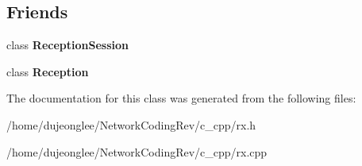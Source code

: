 \subsection*{Friends}
\begin{DoxyCompactItemize}
\item 
class {\bfseries Reception\+Session}\hypertarget{class_network_coding_1_1_reception_block_a6ed072e1f429e5e4bda0467d37cf64b8}{}\label{class_network_coding_1_1_reception_block_a6ed072e1f429e5e4bda0467d37cf64b8}

\item 
class {\bfseries Reception}\hypertarget{class_network_coding_1_1_reception_block_ab65c4855c6a2c2d0c0b90c5108518547}{}\label{class_network_coding_1_1_reception_block_ab65c4855c6a2c2d0c0b90c5108518547}

\end{DoxyCompactItemize}


The documentation for this class was generated from the following files\+:\begin{DoxyCompactItemize}
\item 
/home/dujeonglee/\+Network\+Coding\+Rev/c\+\_\+cpp/rx.\+h\item 
/home/dujeonglee/\+Network\+Coding\+Rev/c\+\_\+cpp/rx.\+cpp\end{DoxyCompactItemize}
